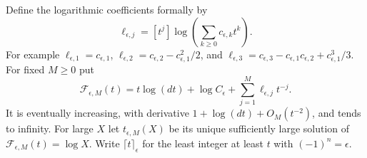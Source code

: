 \documentclass[11pt,letterpaper]{article}
\theoremstyle{remark}\newtheorem{remark}[theorem]{Remark}
\newcommand{\ceilp}[2]{\lceil #1\rceil_{#2}}
\begin{document}
Define the logarithmic coefficients formally by
\begin{equation}\label{lcw:eq:logcoef}
 \ell_{\epsilon,j}=[t^j]\log\left(\sum_{k\ge0}c_{\epsilon,k}t^k\right).
\end{equation}
For example $\ell_{\epsilon,1}=c_{\epsilon,1}$,
$\ell_{\epsilon,2}=c_{\epsilon,2}-c_{\epsilon,1}^2/2$, and
$\ell_{\epsilon,3}=c_{\epsilon,3}-c_{\epsilon,1}c_{\epsilon,2}+c_{\epsilon,1}^3/3$.
For fixed $M\ge0$ put
\begin{equation}\label{lcw:eq:carrier}
 \mathcal F_{\epsilon,M}(t)=t\log(dt)+\log C_\epsilon
                     +\sum_{j=1}^M\ell_{\epsilon,j}t^{-j}.
\end{equation}
It is eventually increasing, with derivative $1+\log(dt)+O_M(t^{-2})$, and tends to infinity. For large $X$ let $t_{\epsilon,M}(X)$ be its unique sufficiently large solution of $\mathcal F_{\epsilon,M}(t)=\log X$. Write $\ceilp{t}{\epsilon}$ for the least integer at least $t$ with $(-1)^n=\epsilon$.
\end{document}
